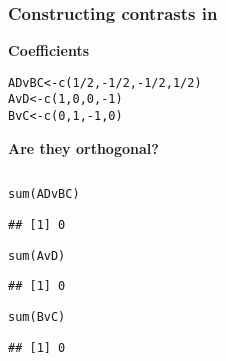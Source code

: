 \documentclass[color=usenames,dvipsnames]{beamer}\usepackage[]{graphicx}\usepackage[]{color}
\makeatletter
\newcommand{\hlnum}[1]{\textcolor[rgb]{0.69,0.494,0}{#1}}%
\newcommand{\hlopt}[1]{\textcolor[rgb]{0,0,0}{#1}}%
\newcommand{\hlstd}[1]{\textcolor[rgb]{0,0,0}{#1}}%
\newcommand{\hlkwb}[1]{\textcolor[rgb]{0,0.341,0.682}{#1}}%
\newcommand{\hlkwd}[1]{\textcolor[rgb]{0.004,0.004,0.506}{#1}}%
\newenvironment{kframe}{%
 \def\at@end@of@kframe{}%
 \ifinner\ifhmode%
  \def\at@end@of@kframe{\end{minipage}}%
  \begin{minipage}{\columnwidth}%
 \fi\fi%
 \def\FrameCommand##1{\hskip\@totalleftmargin \hskip-\fboxsep
 \colorbox{shadecolor}{##1}\hskip-\fboxsep
     \hskip-\linewidth \hskip-\@totalleftmargin \hskip\columnwidth}%
 \MakeFramed {\advance\hsize-\width
   \@totalleftmargin\z@ \linewidth\hsize
   \@setminipage}}%
 {\par\unskip\endMakeFramed%
 \at@end@of@kframe}
\newenvironment{knitrout}{}{} %
\makeatother
\begin{document}
\begin{frame}[fragile]
  \frametitle{Constructing contrasts in \R}
  \small
  {\bf Coefficients}
\begin{knitrout}\scriptsize
{}\color{fgcolor}\begin{kframe}
\begin{alltt}
\hlstd{ADvBC} \hlkwb{<-} \hlkwd{c}\hlstd{(}\hlnum{1}\hlopt{/}\hlnum{2}\hlstd{,} \hlopt{-}\hlnum{1}\hlopt{/}\hlnum{2}\hlstd{,} \hlopt{-}\hlnum{1}\hlopt{/}\hlnum{2}\hlstd{,} \hlnum{1}\hlopt{/}\hlnum{2}\hlstd{)}
\hlstd{AvD} \hlkwb{<-} \hlkwd{c}\hlstd{(}\hlnum{1}\hlstd{,} \hlnum{0}\hlstd{,} \hlnum{0}\hlstd{,} \hlopt{-}\hlnum{1}\hlstd{)}
\hlstd{BvC} \hlkwb{<-} \hlkwd{c}\hlstd{(}\hlnum{0}\hlstd{,} \hlnum{1}\hlstd{,} \hlopt{-}\hlnum{1}\hlstd{,} \hlnum{0}\hlstd{)}
\end{alltt}
\end{kframe}
\end{knitrout}
\pause
{\bf
Are they orthogonal?}
\pause
\begin{columns}
  \begin{column}{0.5\textwidth}
\begin{knitrout}\scriptsize
{}\color{fgcolor}\begin{kframe}
\begin{alltt}
\hlkwd{sum}\hlstd{(ADvBC)}
\end{alltt}
\begin{verbatim}
## [1] 0
\end{verbatim}
\begin{alltt}
\hlkwd{sum}\hlstd{(AvD)}
\end{alltt}
\begin{verbatim}
## [1] 0
\end{verbatim}
\begin{alltt}
\hlkwd{sum}\hlstd{(BvC)}
\end{alltt}
\begin{verbatim}
## [1] 0
\end{verbatim}
\end{kframe}
\end{knitrout}
  \end{column}
  \pause
  \begin{column}{0.5\textwidth}
\begin{knitrout}\scriptsize
{}\color{fgcolor}\begin{kframe}
\begin{alltt}

\end{alltt}
\end{kframe}
\end{knitrout}
\end{column}
\end{columns}
\end{frame}
\end{document}
